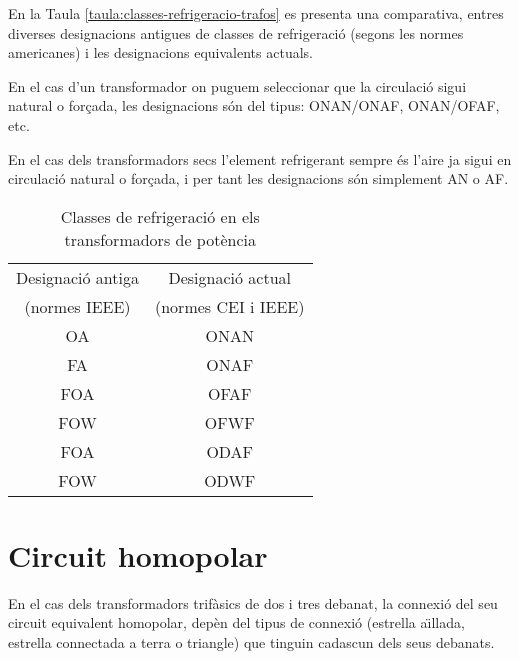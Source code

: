 En la Taula \vref{taula:classes-refrigeracio-trafos} es presenta una
comparativa, entres diverses designacions antigues de classes de
refrigeraci\'{o} (segons les normes americanes) i les designacions
equivalents actuals.

En el cas d'un transformador on puguem seleccionar que la circulaci\'{o}
sigui natural o for\c{c}ada,
les designacions s\'{o}n del tipus: ONAN/ONAF, ONAN/OFAF, etc.

En el cas dels transformadors secs l'element refrigerant sempre \'{e}s
l'aire ja sigui en circulaci\'{o} natural o for\c{c}ada, i per tant les
designacions s\'{o}n simplement AN o AF.

\begin{table}[h]
   \caption{\label{taula:classes-refrigeracio-trafos}
   Classes de refrigeraci\'{o} en els transformadors de pot\`{e}ncia}
   \begin{center}\begin{tabular}{cc}
   \toprule[1pt]
   Designaci\'{o} antiga & Designaci\'{o} actual \\
   (normes \textsf{\textsf{IEEE}})     & (normes \textsf{\textsf{CEI}} i
   \textsf{\textsf{IEEE}}) \\
   \midrule
   OA & ONAN   \\
   FA & ONAF   \\
   FOA & OFAF  \\
   FOW & OFWF  \\
   FOA & ODAF  \\
   FOW & ODWF \\
   \bottomrule[1pt]
   \end{tabular} \end{center}
\end{table}




\section{Circuit homopolar}\label{sec:circuit_homopolar}

En el cas dels transformadors trif\`{a}sics de dos i tres debanat, la connexi\'{o} del seu circuit equivalent homopolar, dep\`{e}n del tipus de connexi\'{o} (estrella a\"{\i}llada, estrella connectada a terra o triangle) que tinguin cadascun dels seus debanats.

